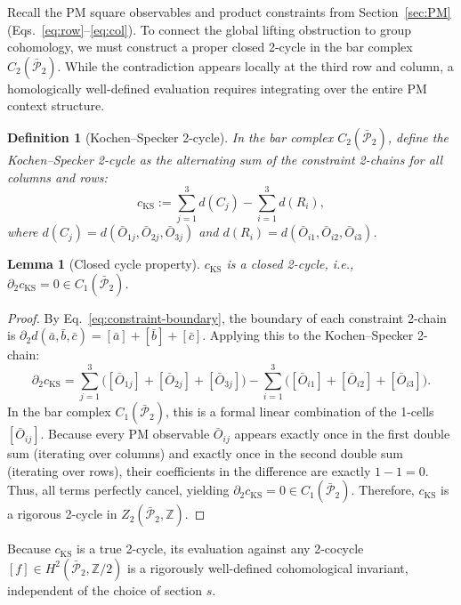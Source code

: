 \documentclass[11pt]{article}
\newtheorem{lemma}[theorem]{Lemma}
\newtheorem{definition}[theorem]{Definition}
\begin{document}
Recall the PM square observables and product constraints from
Section~\ref{sec:PM} (Eqs.~\ref{eq:row}--\ref{eq:col}).
To connect the global lifting obstruction to group cohomology, we must construct a proper closed 2-cycle in the bar complex $C_2(\bar{\mathcal{P}}_2)$. While the contradiction appears locally at the third row and column, a homologically well-defined evaluation requires integrating over the entire PM context structure.

\begin{definition}[Kochen--Specker 2-cycle]
\label{def:ks-cycle}
In the bar complex $C_2(\bar{\mathcal{P}}_2)$, define the \emph{Kochen--Specker 2-cycle} as the alternating sum of the constraint 2-chains for all columns and rows:
\begin{equation}
\label{eq:cks}
c_{\mathrm{KS}} := \sum_{j=1}^3 d(C_j) - \sum_{i=1}^3 d(R_i),
\end{equation}
where $d(C_j) = d(\bar{O}_{1j}, \bar{O}_{2j}, \bar{O}_{3j})$ and $d(R_i) = d(\bar{O}_{i1}, \bar{O}_{i2}, \bar{O}_{i3})$.
\end{definition}

\begin{lemma}[Closed cycle property]
\label{lem:closed}
$c_{\mathrm{KS}}$ is a closed 2-cycle, i.e., $\partial_2 c_{\mathrm{KS}} = 0 \in C_1(\bar{\mathcal{P}}_2)$.
\end{lemma}
\begin{proof}
By Eq.~\eqref{eq:constraint-boundary}, the boundary of each constraint 2-chain is $\partial_2 d(\bar{a}, \bar{b}, \bar{c}) = [\bar{a}] + [\bar{b}] + [\bar{c}]$. Applying this to the Kochen--Specker 2-chain:
\[
\partial_2 c_{\mathrm{KS}} = \sum_{j=1}^3 \bigl( [\bar{O}_{1j}] + [\bar{O}_{2j}] + [\bar{O}_{3j}] \bigr) - \sum_{i=1}^3 \bigl( [\bar{O}_{i1}] + [\bar{O}_{i2}] + [\bar{O}_{i3}] \bigr).
\]
In the bar complex $C_1(\bar{\mathcal{P}}_2)$, this is a formal linear combination of the 1-cells $[\bar{O}_{ij}]$. Because every PM observable $\bar{O}_{ij}$ appears exactly once in the first double sum (iterating over columns) and exactly once in the second double sum (iterating over rows), their coefficients in the difference are exactly $1 - 1 = 0$. Thus, all terms perfectly cancel, yielding $\partial_2 c_{\mathrm{KS}} = 0 \in C_1(\bar{\mathcal{P}}_2)$. Therefore, $c_{\mathrm{KS}}$ is a rigorous 2-cycle in $Z_2(\bar{\mathcal{P}}_2, \mathbb{Z})$.
\end{proof}

Because $c_{\mathrm{KS}}$ is a true 2-cycle, its evaluation against any 2-cocycle $[f] \in H^2(\bar{\mathcal{P}}_2, \mathbb{Z}/2)$ is a rigorously well-defined cohomological invariant, independent of the choice of section $s$.
\end{document}
